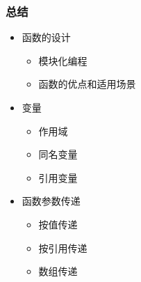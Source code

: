 \begin{frame}[fragile]
    \frametitle{总结}
    \begin{itemize}
        \item<1-> 函数的设计
        
        \begin{itemize}
            \item 模块化编程
            \item 函数的优点和适用场景
        \end{itemize}

        \item<2-> 变量
        
        \begin{itemize}
            \item 作用域
            \item 同名变量
            \item 引用变量
        \end{itemize}

        \item<3-> 函数参数传递
        
        \begin{itemize}
            \item 按值传递
            \item 按引用传递
            \item 数组传递
        \end{itemize}

    \end{itemize}
\end{frame}


